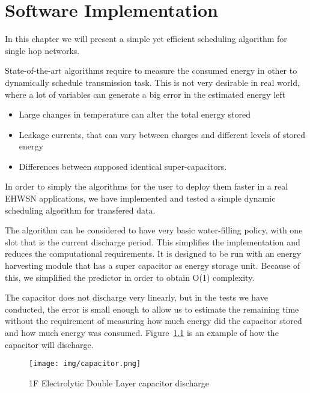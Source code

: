 \normalfont\normalsize
\chapter{Software Implementation}

In this chapter we will present a simple yet efficient scheduling algorithm for single hop networks.

State-of-the-art algorithms require to measure the consumed energy in other to dynamically schedule transmission
task. This is not very desirable in real world, where a lot of variables can generate a big error in the estimated energy left

\begin{itemize}
    \item Large changes in temperature can alter the total energy stored
    \item Leakage currents, that can vary between charges and different levels of stored energy
    \item Differences between supposed identical super-capacitors.
\end{itemize}

In order to simply the algorithms for the user to deploy them faster in a real EHWSN applications,
we have implemented and tested a simple dynamic scheduling algorithm for transfered data.

The algorithm can be considered to have very basic water-filling policy, with one slot that is
the current discharge period. This simplifies the implementation and reduces the computational
requirements. It is designed to be run with an energy harvesting module that has a super capacitor
as energy storage unit. Because of this, we simplified the predictor in order to obtain O(1)
complexity.

The capacitor does not discharge very linearly, but in the tests we have conducted, the error is
small enough to allow us to estimate the remaining time without the requirement of measuring how
much energy did the capacitor stored and how much energy was consumed.
Figure~\ref{fig:capdisch} is an example of how the capacitor will discharge.

\begin{figure}[ht] \centering
\texttt{[image: img/capacitor.png]}
\caption{1F Electrolytic Double Layer capacitor discharge}
\label{fig:capdisch}
\end{figure}

